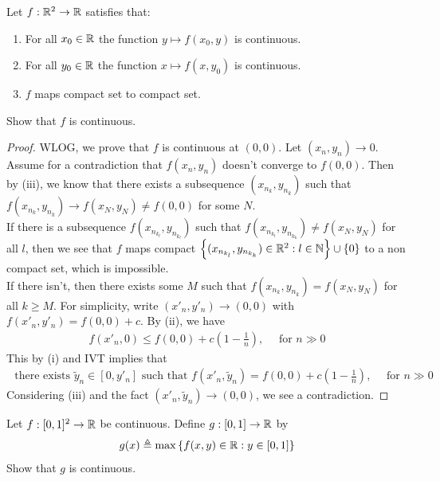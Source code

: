 \documentclass{report}
\begin{document}
\begin{question}{}{}
Let $f:\mathbb{R}^2 \rightarrow \mathbb{R}$ satisfies that: 
\begin{enumerate}[label=(\roman*)]
  \item For all $x_0\in\mathbb{R}$ the function $y \mapsto  f(x_0,y)$ is continuous.
  \item For all $y_0\in\mathbb{R}$ the function $x \mapsto  f(x,y_0)$ is continuous. 
  \item $f$ maps compact set to compact set. 
\end{enumerate}
Show that $f$ is continuous. 
\end{question}
\begin{proof}
WLOG, we prove that $f$ is continuous at $(0,0)$. Let $(x_n,y_n)\rightarrow 0$. Assume for a contradiction that $f(x_n,y_n)$ doesn't converge to $f(0,0)$. Then by (iii), we know that there exists a subsequence $(x_{n_k},y_{n_k})$ such that  $f(x_{n_k},y_{n_k})\rightarrow f(x_N,y_N)\neq f(0,0)$ for some $N$.  \\

If there is a subsequence $f(x_{n_{k_l}},y_{n_{k_l}})$ such that $f(x_{n_{k_l}},y_{n_{k_k}})\neq f(x_N,y_N)$ for all $l$, then we see that  $f$ maps compact $\left\{ (x_{n_{k_l}},y_{n_{k_k}})\in\mathbb{R}^2:l\in\mathbb{N} \right\}\cup  \left\{ 0 \right\}$ to a non compact set, which is impossible.\\

If there isn't, then there exists some $M$ such that  $f(x_{n_k},y_{n_k})=f(x_N,y_N)$ for all $k\geq M$. For simplicity, write $(x'_n,y'_n)\rightarrow (0,0)$ with $f(x'_n,y'_n)=f(0,0)+c$. By (ii), we have 
\begin{align*}
f(x'_n,0) \leq f(0,0)+c(1-\frac{1}{n}),\quad \text{ for  }n\gg 0 
\end{align*}
This by (i) and IVT implies that 
\begin{align*}
\text{ there exists } \tilde{y}_n \in [0,y'_n]\text{ such that }f(x'_n,\tilde{y}_n)= f(0,0) + c(1-\frac{1}{n}),\quad \text{ for }n\gg 0 
\end{align*}
Considering  (iii) and the fact $(x'_n,\tilde{y}_n)\rightarrow (0,0)$, we see a contradiction. 
\end{proof}
\begin{question}{}{}
Let $f:[0,1]^2 \rightarrow \mathbb{R}$ be continuous. Define $g:[0,1]\rightarrow \mathbb{R}$ by 
\begin{align*}
g(x)\triangleq \max \left\{ f(x,y)\in\mathbb{R} : y \in [0,1] \right\}
\end{align*}
Show that $g$ is continuous. 
\end{question}
\end{document}
